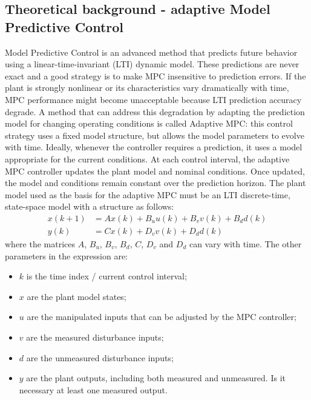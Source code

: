 \documentclass[conference, 11pt]{IEEEtran}
\begin{document}
\subsection{Theoretical background - adaptive Model Predictive Control}
Model Predictive Control is an advanced method that predicts future behavior using a linear-time-invariant (LTI) dynamic model. These predictions are never exact and a good strategy is to make MPC insensitive to prediction errors. If the plant is strongly nonlinear or its characteristics vary dramatically with time, MPC performance might become unacceptable because LTI prediction accuracy degrade. A method that can address this degradation by adapting the prediction model for changing operating conditions is called Adaptive MPC: this control strategy uses a fixed model structure, but allows the model parameters to evolve with time. Ideally, whenever the controller requires a prediction, it uses a model appropriate for the current conditions. At each control interval, the adaptive MPC controller updates the plant model and nominal conditions. Once updated, the model and conditions remain constant over the prediction horizon. The plant model used as the basis for the adaptive MPC must be an LTI discrete-time, state-space model with a structure as follows:
\begin{equation*}
\label{eqn:Adaptive_MPC_plant_discrete}
\begin{aligned}
x(k+1)&=Ax(k)+ B_u u(k)+B_v v(k)+B_d d(k)\\
y(k)&=Cx(k) + D_v v(k)+ D_d d(k)
\end{aligned}
\end{equation*}
where the matrices $A$, $B_u$, $B_v$, $B_d$, $C$, $D_v$ and $D_d$ can vary with time. The other parameters in the expression are:
\begin{itemize}
	\item $k$ is the time index / current control interval;
	\item $x$ are the plant model states;
	\item $u$ are the manipulated inputs that can be adjusted by the MPC controller;
	\item $v$ are the measured disturbance inputs;
	\item $d$ are the unmeasured disturbance inputs;
	\item $y$ are the plant outputs, including both measured and unmeasured. Is it necessary at least one measured output.
\end{itemize}
\end{document}
